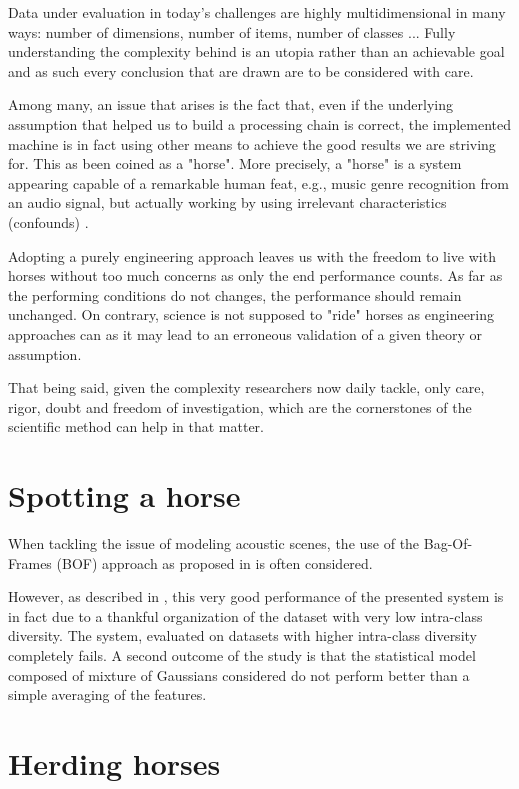 \documentclass[a4paper,fleqn]{tufte-handout}
\begin{document}
Data under evaluation in today's challenges are highly multidimensional in many ways: number of dimensions, number of items, number of classes ... Fully understanding the complexity behind is an utopia rather than an achievable goal and as such every conclusion that are drawn are to be considered with care.

Among many, an issue that arises is the fact that, even if the underlying assumption that helped us to build a processing chain is correct, the implemented machine is in fact using other means to achieve the good results we are striving for. This as been coined as a "horse". More precisely, a "horse" is a system appearing capable of a remarkable human feat, e.g., music genre recognition from an audio signal, but actually working by using irrelevant characteristics (confounds) \cite{6847693}.

Adopting a purely engineering approach leaves us with the freedom to live with horses without too much concerns as only the end performance counts. As far as the performing conditions do not changes, the performance should remain unchanged. On contrary, science is not supposed to "ride" horses as engineering approaches can as it may lead to an erroneous validation of a given theory or assumption.

That being said, given the complexity researchers now daily tackle, only care, rigor, doubt and freedom of investigation, which are the cornerstones of the scientific method can help in that matter.

\section{Spotting a horse}

When tackling the issue of modeling acoustic scenes, the use of the Bag-Of-Frames (BOF) approach as proposed in \cite{aucouturier2007bag} is often considered.

However, as described in \cite{lagrange:hal-01082501}, this very good performance of the presented system is in fact due to a thankful organization of the dataset with very low intra-class diversity. The system, evaluated on datasets with higher intra-class diversity completely fails. A second outcome of the study is that the statistical model composed of mixture of Gaussians considered do not perform better than a simple averaging of the features.

\section{Herding horses}
\end{document}

